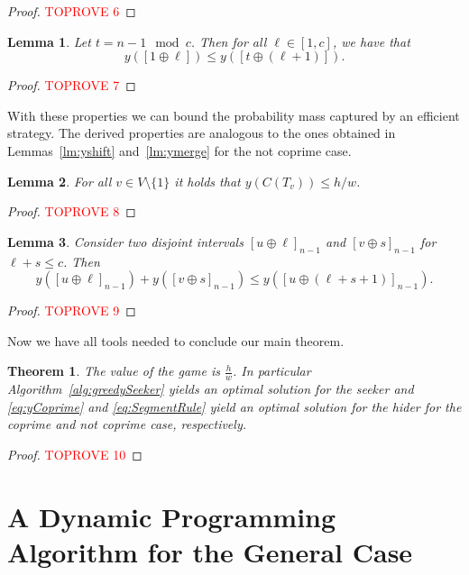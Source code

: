 \documentclass[11pt]{article}
\newtheorem{theorem}{Theorem}[section]
\newtheorem{lemma}{Lemma}[section]
\newcommand\+{\mkern2mu}
\begin{document}
\begin{proof}\textcolor{red}{TOPROVE 6}\end{proof}


\begin{lemma}\label{lm:ySpread}
    Let $t=n-1 \mod c$. Then for all $\ell \in [1, c]$, we have that
    $$
        y([1\oplus \ell])\leq y([t\oplus (\ell+1)]).
    $$
\end{lemma}
\begin{proof}\textcolor{red}{TOPROVE 7}\end{proof}

With these properties we can bound the probability mass captured by an efficient strategy. The derived properties are analogous to the ones obtained in Lemmas~\ref{lm:yshift} and~\ref{lm:ymerge} for the not coprime case. 

\begin{lemma}\label{lm:yCtmax}
For all $v\in V\setminus\{1\}$ it holds that $y(C(T_v))\le h/w$.
\end{lemma}
\begin{proof}\textcolor{red}{TOPROVE 8}\end{proof}

\begin{lemma}\label{lm:ymergeCoprime}
Consider two disjoint intervals $[u\oplus\ell]_{n-1}$ and $[v\oplus s]_{n-1}$ for $\ell+s\le c$. Then 
$$y([u\oplus \ell]_{n-1})+y([v\oplus s]_{n-1})\le y([u\oplus (\ell+s+1)]_{n-1}).$$
\end{lemma}
\begin{proof}\textcolor{red}{TOPROVE 9}\end{proof}

Now we have all tools needed to conclude our main theorem.

\begin{theorem} 
The value of the game is $\frac{h}{w}$. In particular Algorithm~\ref{alg:greedySeeker} yields an optimal solution for the seeker and \eqref{eq:yCoprime} and \eqref{eq:SegmentRule} yield an optimal solution for the hider for the coprime and not coprime case, respectively.
\end{theorem}
\begin{proof}\textcolor{red}{TOPROVE 10}\end{proof}


\section{A Dynamic Programming Algorithm for the General Case }\label{sec:DP}
\end{document}
